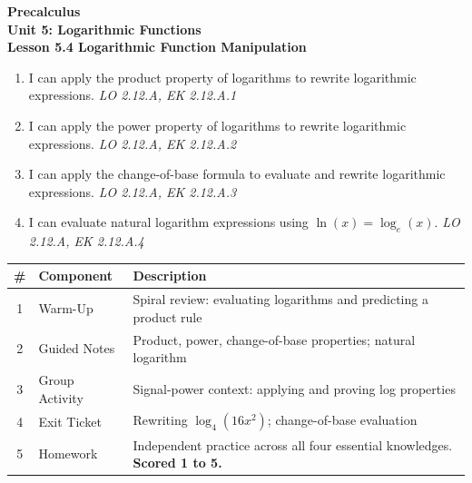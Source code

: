 \documentclass[10pt]{article}
\begin{document}
\vspace{-0.8in}

\begin{center}
  {\color{white}\textbf{\LARGE Precalculus}}\\[4pt]
  {\color{skymid}\large\textbf{Unit 5: Logarithmic Functions}}\\[6pt]
  {\color{white}\textbf{\large Lesson 5.4 \quad Logarithmic Function Manipulation}}
\end{center}

\vspace{0.22in}
\namedateperiod
\vspace{0.18in}

\begin{learningtargetbox}
\small
\begin{enumerate}[leftmargin=1.5em, itemsep=5pt]
  \item I can apply the product property of logarithms to rewrite logarithmic expressions.
        \hfill\textit{LO 2.12.A, EK 2.12.A.1}
  \item I can apply the power property of logarithms to rewrite logarithmic expressions.
        \hfill\textit{LO 2.12.A, EK 2.12.A.2}
  \item I can apply the change-of-base formula to evaluate and rewrite logarithmic expressions.
        \hfill\textit{LO 2.12.A, EK 2.12.A.3}
  \item I can evaluate natural logarithm expressions using $\ln(x) = \log_e(x)$.
        \hfill\textit{LO 2.12.A, EK 2.12.A.4}
\end{enumerate}
\end{learningtargetbox}

\vspace{0.14in}

\begin{tocbox}
\small
\renewcommand{\arraystretch}{1.5}
\begin{tabularx}{\linewidth}{@{} c l X @{}}
\rowcolor{sky}
\textbf{\#} & \textbf{Component} & \textbf{Description} \\
\midrule
1 & Warm-Up        & Spiral review: evaluating logarithms and predicting a product rule \\
2 & Guided Notes   & Product, power, change-of-base properties; natural logarithm \\
3 & Group Activity & Signal-power context: applying and proving log properties \\
4 & Exit Ticket    & Rewriting $\log_4(16x^2)$; change-of-base evaluation \\
5 & Homework       & Independent practice across all four essential knowledges. \textbf{Scored 1 to 5.} \\
\end{tabularx}
\end{tocbox}
\end{document}
